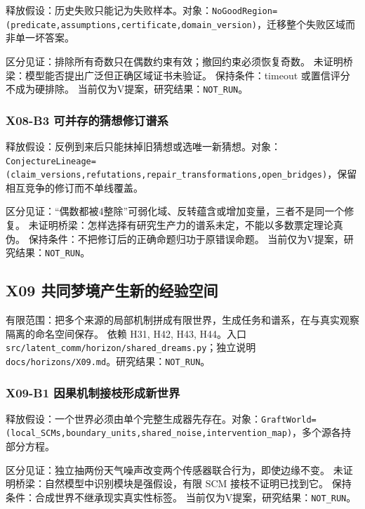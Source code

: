 \documentclass[
  10pt,
]{article}
\begin{document}
释放假设：历史失败只能记为失败样本。对象：\nolinkurl{NoGoodRegion=(predicate,assumptions,certificate,domain_version)}，迁移整个失败区域而非单一坏答案。

区分见证：排除所有奇数只在偶数约束有效；撤回约束必须恢复奇数。
未证明桥梁：模型能否提出广泛但正确区域证书未验证。 保持条件：timeout
或置信评分不成为硬排除。 当前仅为V提案，研究结果：\nolinkurl{NOT_RUN}。

\subsubsection{X08-B3
可并存的猜想修订谱系}\label{x08-b3-ux53efux5e76ux5b58ux7684ux731cux60f3ux4feeux8ba2ux8c31ux7cfb}

释放假设：反例到来后只能抹掉旧猜想或选唯一新猜想。对象：\nolinkurl{ConjectureLineage=(claim_versions,refutations,repair_transformations,open_bridges)}，保留相互竞争的修订而不单线覆盖。

区分见证：``偶数都被4整除''可弱化域、反转蕴含或增加变量，三者不是同一个修复。
未证明桥梁：怎样选择有研究生产力的谱系未定，不能以多数票定理论真伪。
保持条件：不把修订后的正确命题归功于原错误命题。
当前仅为V提案，研究结果：\nolinkurl{NOT_RUN}。

\subsection{X09
共同梦境产生新的经验空间}\label{x09-ux5171ux540cux68a6ux5883ux4ea7ux751fux65b0ux7684ux7ecfux9a8cux7a7aux95f4}

有限范围：把多个来源的局部机制拼成有限世界，生成任务和谱系，在与真实观察隔离的命名空间保存。
依赖 H31, H42, H43, H44。入口
{\small\nolinkurl{src/latent_comm/horizon/shared_dreams.py}}；独立说明
{\small\nolinkurl{docs/horizons/X09.md}}。研究结果：\nolinkurl{NOT_RUN}。

\subsubsection{X09-B1
因果机制接枝形成新世界}\label{x09-b1-ux56e0ux679cux673aux5236ux63a5ux679dux5f62ux6210ux65b0ux4e16ux754c}

释放假设：一个世界必须由单个完整生成器先存在。对象：\nolinkurl{GraftWorld=(local_SCMs,boundary_units,shared_noise,intervention_map)}，多个源各持部分方程。

区分见证：独立抽两份天气噪声改变两个传感器联合行为，即使边缘不变。
未证明桥梁：自然模型中识别模块是强假设，有限 SCM 接枝不证明已找到它。
保持条件：合成世界不继承现实真实性标签。
当前仅为V提案，研究结果：\nolinkurl{NOT_RUN}。
\end{document}
